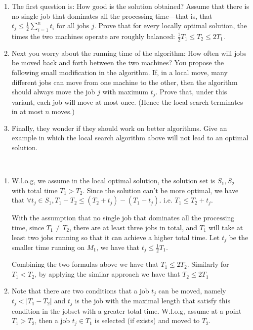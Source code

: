 \begin{exercise}[]
{    \begin{enumerate}
        \item The first question is: How good is the solution obtained? Assume that there is no single job that dominates all the processing time—that is, that $t_j \leqslant  \frac{1}{2} \sum_{i=1}^n t_i$ for all jobs $j$. Prove that for every locally  optimal solution, the times the two machines operate are roughly balanced: $\frac{1}{2}T_1 \leqslant T_2 \leqslant 2T_1$.
        \item Next you worry about the running time of the algorithm: How often will jobs be moved back and forth between the two machines? You propose the following small modification in the algorithm. If, in a local move, many different jobs can move from one machine to the other, then the algorithm should always move the job $j$ with maximum $t_j$. Prove that, under this variant, each job will move at most once. (Hence the local search terminates in at most $n$ moves.)
        \item Finally, they wonder if they should work on better algorithms. Give an example in which the local search algorithm above will not lead to an optimal solution.
    \end{enumerate}
    }
  \begin{solution}
  \par{~}
  \begin{enumerate}
    \item W.l.o.g, we assume in the local optimal solution, the solution set is $S_1, S_2$ with total time $T_1 > T_2$. Since the solution can't be more optimal, we have that $\forall t_j \in S_1, T_1 - T_2 \le (T_2 + t_j) - (T_1 - t_j)$. i.e. $T_1 \le T_2 + t_j$. 
    
    With the assumption that no single job that dominates all the processing time, since $T_1 \neq T_2$, there are at least three jobs in total, and $T_1$ will take at least two jobs running so that it can achieve a higher total time. Let $t_j$ be the smaller time running on $M_1$, we have that $t_j \le \frac{1}{2} T_1$.

    Combining the two formulas above we have that $T_1 \le 2T_2$. Similarly for $T_1 < T_2$, by applying the similar approach we have that $T_2 \le 2T_1$
    

    \item Note that there are two conditions that a job $t_j$ can be moved, namely $t_j < |T_1 - T_2|$ and $t_j$ is the job with the maximal length that satisfy this condition in the jobset with a greater total time. W.l.o.g, assume at a point $T_1 > T_2$, then a job $t_j \in T_1$ is selected (if exists) and moved to $T_2$.
    

\end{enumerate}
\end{solution}
\end{exercise}
